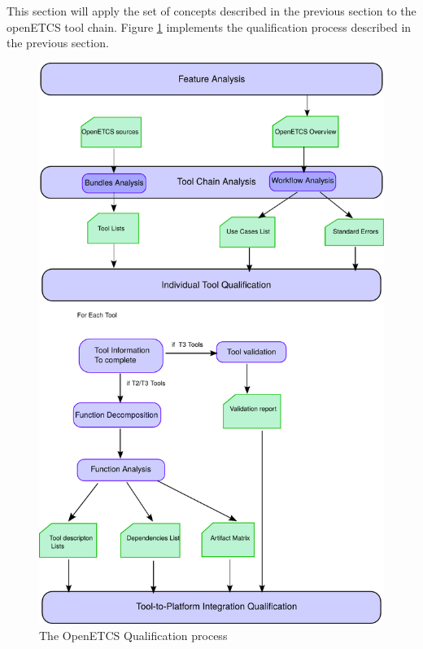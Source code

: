 This section will apply the set of concepts described in the previous
section to the openETCS tool chain.
Figure \ref{fig:openetcs-process} implements the qualification process
described in the previous section.

\begin{figure}[htbp]
\includegraphics[width=\textwidth]{openETCS_process.pdf}
\caption{\label{fig:openetcs-process} The OpenETCS Qualification process}
\end{figure}

